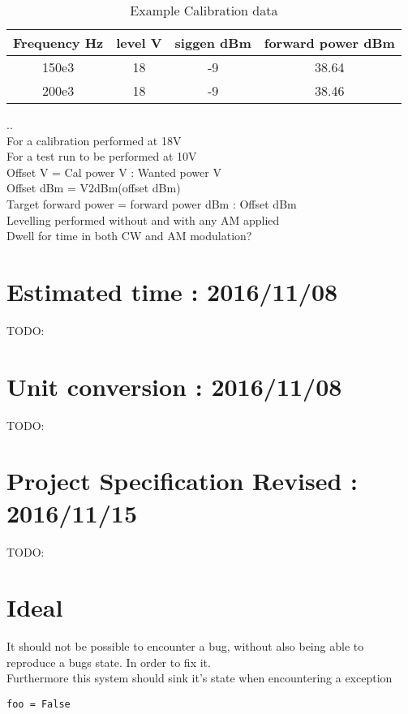 \documentclass[a4paper]{article}
\begin{document}
\begin{table}[h!]
\centering
\begin{tabular}{||c c c c||}
 \hline
 Frequency Hz & level V & siggen dBm & forward power dBm \\ [0.5ex]
 \hline
 150e3 & 18 & -9 & 38.64 \\
 200e3 & 18 & -9 & 38.46 \\
 \hline
\end{tabular}
\caption{Example Calibration data}
\label{table:1}
\end{table}
..\\
For a calibration performed at 18V\\
For a test run to be performed at 10V\\
Offset V = Cal power V : Wanted power V\\
Offset dBm = V2dBm(offset dBm)\\
Target forward power = forward power dBm : Offset dBm\\

Levelling performed without and with any AM applied\\
Dwell for time in both CW and AM modulation?\\

\section{Estimated time : 2016/11/08}
TODO:

\section{Unit conversion : 2016/11/08}
TODO:

\section{Project Specification Revised : 2016/11/15}
TODO:

\section{Ideal}
It should not be possible to encounter a bug, without also being able to reproduce a bugs state. In order to fix it.\\
Furthermore this system should sink it's state when encountering a exception\\

\begin{lstlisting}
foo = False
\end{lstlisting}







\newpage
\newpage

\newpage\glsaddall\printglossaries
\newpage\listoftables\lstlistoflistings
\end{document}
